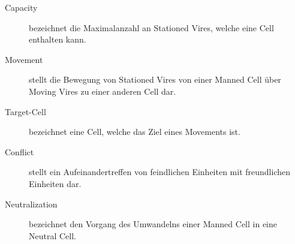 \begin{description}
	\item[Capacity] bezeichnet die Maximalanzahl an Stationed Vires, welche eine Cell enthalten kann.
	\item[Movement] stellt die Bewegung von Stationed Vires von einer Manned Cell über Moving Vires zu einer anderen Cell dar. 
	\item[Target-Cell] bezeichnet eine Cell, welche das Ziel eines Movements ist.
	\item[Conflict] stellt ein Aufeinandertreffen von feindlichen Einheiten mit freundlichen Einheiten dar.
	\item[Neutralization] bezeichnet den Vorgang des Umwandelns einer Manned Cell in eine Neutral Cell.
\end{description}